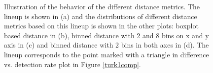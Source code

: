 \documentclass[12]{article}
\begin{document}
\begin{figure}[hbtp]
{\label{t1bin_1}
}
	\vspace{-.1in}
\caption[Optional caption for list of figures]{Illustration of the behavior of the different distance metrics. The lineup is shown in (a) and the distributions of different distance metrics based on this lineup is shown in the other plots: boxplot based distance in (b), binned distance with 2 and 8 bins on x and y axis in (c) and binned distance with 2 bins in both axes in (d). The lineup corresponds to the point marked with a triangle in difference vs. detection rate plot in Figure \ref{turk1comp}. }
\label{turk1-exp}
\end{figure}
\end{document}
